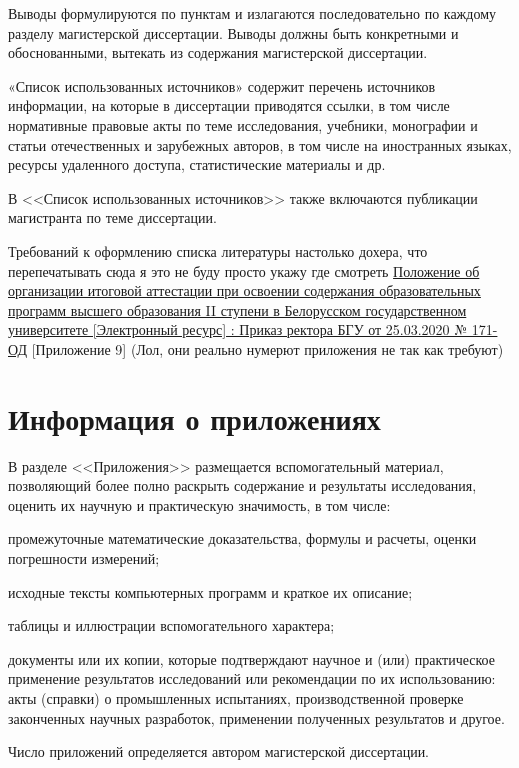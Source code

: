 \documentclass{mpaper}
\begin{document}
    Выводы формулируются по пунктам и излагаются последовательно по каждому разделу магистерской диссертации. Выводы должны быть конкретными и обоснованными, вытекать из содержания магистерской диссертации.

    «Список использованных источников» содержит перечень источников информации, на которые в диссертации приводятся ссылки, в том числе нормативные правовые акты по теме исследования, учебники, монографии и статьи отечественных и зарубежных авторов, в том числе на иностранных языках, ресурсы удаленного доступа, статистические материалы и др.

    В <<Список использованных источников>> также включаются публикации магистранта по теме диссертации.
    \begin{thebibliography}{9}
         Требований к оформлению списка литературы настолько дохера, что перепечатывать сюда я это не буду просто укажу где смотреть
         \href{https://rci.bsu.by/images/docs/prikaz_polozhenie_ob_attestatsi_magistratura_2020.pdf}{Положение об организации итоговой аттестации при освоении содержания образовательных программ высшего образования II ступени в Белорусском государственном университете [Электронный ресурс] : Приказ ректора БГУ от 25.03.2020 № 171-ОД} [Приложение 9] (Лол, они реально нумерют приложения не так как требуют)
    \end{thebibliography}
    \appendix
    \chapter{Информация о приложениях}
    В разделе <<Приложения>> размещается вспомогательный материал, позволяющий более полно раскрыть содержание и результаты исследования, оценить их научную и практическую значимость, в том числе:

    промежуточные математические доказательства, формулы и расчеты, оценки погрешности измерений;

    исходные тексты компьютерных программ и краткое их описание;

    таблицы и иллюстрации вспомогательного характера;

    документы или их копии, которые подтверждают научное и (или) практическое применение результатов исследований или рекомендации по их использованию: акты (справки) о промышленных испытаниях, производственной проверке законченных научных разработок, применении полученных результатов и другое.

    Число приложений определяется автором магистерской диссертации.
\end{document}
